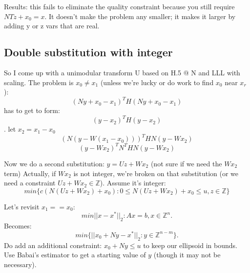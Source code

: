\documentclass[11pt]{article}
\theoremstyle{definition}
\theoremstyle{remark}
\begin{document}
Results: this fails to eliminate the quality constraint because you still require $NTz + x_0=x$. It doesn't make the problem any smaller; it makes it larger by adding y or z vars that are real.

\subsection{Double substitution with integer}

So I come up with a unimodular transform U based on H.5 @ N and LLL with scaling. The problem is $x_0 \neq x_1$ (unless we're lucky or do work to find $x_0$ near $x_r$):
$$(Ny + x_0 - x_1)^T H (Ny + x_0 - x_1)$$ has to get to form: $$(y - x_2)^T H (y - x_2)$$ . let $x_2 = x_1 - x_0$
$$(N (y - W(x_1 - x_0)))^T H N (y - Wx_2)$$
$$(y - Wx_2)^T N^T H N (y - Wx_2)$$

Now we do a second substitution: $y = Uz + Wx_2$  (not sure if we need the $Wx_2$ term)
Actually, if $Wx_2$ is not integer, we're broken on that substitution (or we need a constraint $Uz + Wx_2 \in \mathbb{Z}$). Assume it's integer:
$$min \{ c(N(Uz + Wx_2) + x_0) : 0 \leq N(Uz + Wx_2) + x_0 \leq u, z \in \mathbb{Z}  \}$$

Let's revisit $x_1 == x_0$: $$min ||x - x^*||_2: Ax=b, x \in \mathbb{Z}^n.$$ Becomes: $$min \{|| x_0 + Ny - x^* ||_2 : y \in \mathbb{Z}^{n-m} \}.$$ Do add an additional constraint: $x_0 + Ny \leq u$ to keep our ellipsoid in bounds.
Use Babai's estimator to get a starting value of $y$ (though it may not be necessary).
\end{document}
